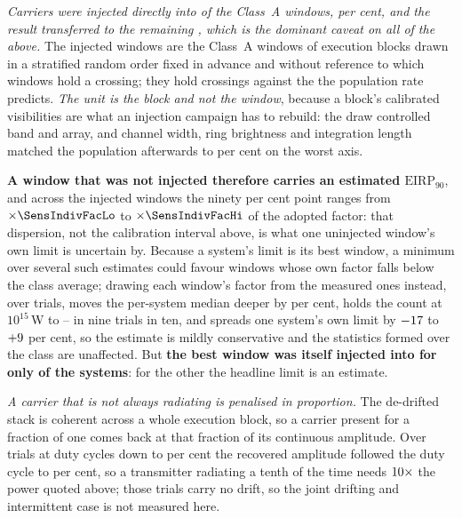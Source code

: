 \emph{Carriers were injected directly into \SensNInj{} of the \NWinA{}
Class~A windows, \SensNInjPct{} per cent, and the result transferred to the
remaining \SensNTransfer, which is the dominant caveat on all of the above.}
The injected windows are the Class~A windows of execution blocks drawn in a
stratified random order fixed in advance and without reference to which
windows hold a crossing; they hold \SensNCrossAch{} crossings against the
\SensNCrossExp{} the population rate predicts. \emph{The unit is the block and
not the window}, because a block's calibrated visibilities are what an
injection campaign has to rebuild: the draw controlled band and array, and
channel width, ring brightness and integration length matched the population
afterwards to \SensCovWorstPct{} per cent on the worst axis.

\textbf{A window that was not injected therefore carries an estimated
$\mathrm{EIRP}_{90}$}, and across the injected windows the ninety per cent
point ranges from $\times\SensIndivFacLo$ to $\times\SensIndivFacHi$ of the
adopted factor: that dispersion, not the calibration interval above, is what
one uninjected window's own limit is uncertain by. Because a system's limit is
its best window, a minimum over several such estimates could favour windows
whose own factor falls below the class average; drawing each window's factor
from the \SensNInj{} measured ones instead, over \ScRsNTrial{} trials, moves
the per-system median deeper by \ScRsMedShiftPct{} per cent, holds the count
at $10^{15}$\,W to \ScRsNLo--\ScRsNHi{} in nine trials in ten, and spreads one
system's own limit by $-17$ to $+9$ per cent, so the
estimate is mildly conservative and the statistics formed over the class are
unaffected. But \textbf{the best window was itself injected into for only
\SmcNMeasSys{} of the \NSysClassA{} systems}: for the other \SmcNEstSys{} the
headline limit is an estimate.

\emph{A carrier that is not always radiating is penalised in proportion.} The
de-drifted stack is coherent across a whole execution block, so a carrier
present for a fraction of one comes back at that fraction of its continuous
amplitude. Over \DutyNTrial{} trials at duty cycles down to
\DutyCycleMinPct{} per cent the recovered amplitude followed the duty cycle to
\DutyAttenDevPct{} per cent, so a transmitter radiating a tenth of the time
needs $10\times$ the power quoted above; those trials carry no drift,
so the joint drifting and intermittent case is not measured here.

